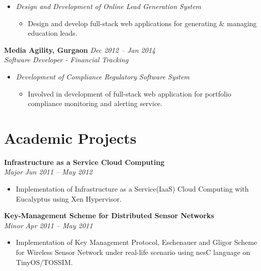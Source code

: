 \documentclass[margin,line]{resume}
\begin{document}
\begin{resume}
\begin{itemize}
     \item \textsl{Design and Development of Online Lead Generation System}
        \begin{itemize}
            \item Design and develop full-stack web applications for generating \& managing education leads.
        \end{itemize}
   \end{itemize}

\textbf{Media Agility, Gurgaon}   \hfill \textsl{Dec 2012 -- Jan 2014} \vspace{0mm}\\\vspace{0mm}%
           \textsl{Software Developer - Financial Tracking}\\
    \begin{itemize}
    
     \item \textsl{Development of Compliance Regulatory Software System} 
        \begin{itemize}
            \item Involved in development of full-stack web application for portfolio compliance monitoring and alerting service.
        \end{itemize}
    
    \end{itemize}

    
    \section{\mysidestyle Academic Projects}
    \textbf{Infrastructure as a Service Cloud Computing}\vspace{0mm}\\\vspace{0mm}%
    \textsl{Major} \hfill \textsl{Jun 2011 -- May 2012}
       \begin{itemize} 
	        \item Implementation of Infrastructure as a Service(IaaS) Cloud Computing with Eucalyptus using Xen Hypervisor.
       \end{itemize}

    \textbf{Key-Management Scheme for Distributed Sensor Networks}\vspace{0mm}\\\vspace{0mm}%
    \textsl{Minor} \hfill \textsl{Apr 2011 -- May 2011}
       \begin{itemize} 
            \item Implementation of Key Management Protocol, Eschenauer and Gligor Scheme for Wireless Sensor Network under real-life scenario using nesC language on TinyOS/TOSSIM.
       \end{itemize}

\end{resume}
\end{document}

